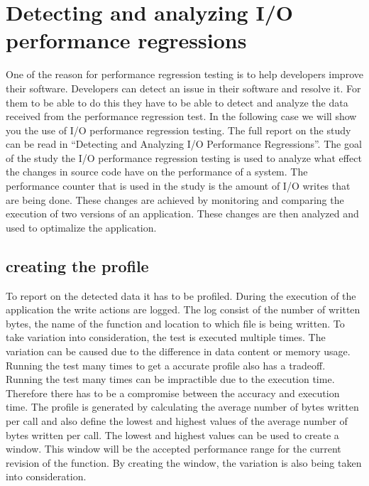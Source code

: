 \documentclass[oneside]{book}
\begin{document}
\clearpage %
\tableofcontents

\clearpage %
\listoffigures

\clearpage %
\listoftables

\mainmatter
% 


\chapter{Detecting and analyzing I/O performance regressions}
\label{chapter:first}

One of the reason for performance regression testing is to help developers improve their software. Developers can detect an issue in their software and resolve it. For them to be able to do this they have to be able to detect and analyze the data received from the performance regression test. In the following case we will show you the use of I/O performance regression testing. The full report on the study can be read in ``Detecting and Analyzing I/O Performance Regressions''. \newline
The goal of the study the I/O performance regression testing is used to analyze what effect the changes in source code have on the performance of a system. The performance counter that is used in the study is the amount of I/O writes that are being done. These changes are achieved by monitoring and comparing the execution of two versions of an application. These changes are then analyzed and used to optimalize the application. \newline

\section*{creating the profile}
To report on the detected data it has to be profiled. During the execution of the application the write actions are logged. The log consist of the number of written bytes, the name of the function and location to which file is being written. To take variation into consideration, the test is executed multiple times. The variation can be caused due to the difference in data content or memory usage. Running the test many times to get a accurate profile also has a tradeoff. Running the test many times can be impractible due to the execution time. Therefore there has to be a compromise between the accuracy and execution time. \newline
The profile is generated by calculating the average number of bytes written per call and also define the lowest and highest values of the average number of bytes written per call. The lowest and highest values can be used to create a window. This window will be the accepted performance range for the current revision of the function. By creating the window, the variation is also being taken into consideration.
\end{document}

